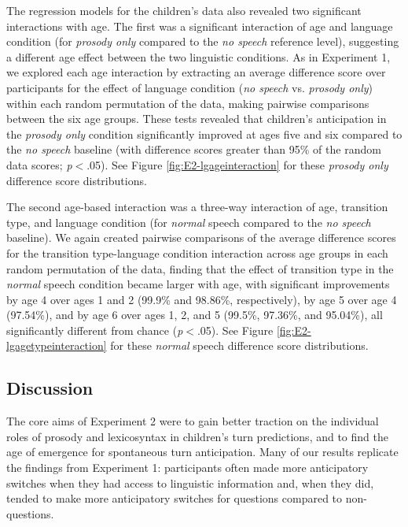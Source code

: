 \documentclass[authoryear, 12pt]{elsarticle}
\begin{document}
The regression models for the children's data also revealed two significant interactions with age. The first was a significant interaction of age and language condition (for \textit{prosody only} compared to the \textit{no speech} reference level), suggesting a different age effect between the two linguistic conditions. As in Experiment 1, we explored each age interaction by extracting an average difference score over participants for the effect of language condition (\textit{no speech} vs. \textit{prosody only}) within each random permutation of the data, making pairwise comparisons between the six age groups. These tests revealed that children's anticipation in the \textit{prosody only} condition significantly improved at ages five and six compared to the \textit{no speech} baseline (with difference scores greater than 95\% of the random data scores; \textit{p}$<$.05). See Figure \ref{fig:E2-lgageinteraction} for these \textit{prosody only} difference score distributions.

The second age-based interaction was a three-way interaction of age, transition type, and language condition (for \textit{normal} speech compared to the \textit{no speech} baseline). We again created pairwise comparisons of the average difference scores for the transition type-language condition interaction across age groups in each random permutation of the data, finding that the effect of transition type in the \textit{normal} speech condition became larger with age, with significant improvements by age 4 over ages 1 and 2 (99.9\% and 98.86\%, respectively), by age 5 over age 4 (97.54\%), and by age 6 over ages 1, 2, and 5 (99.5\%, 97.36\%, and 95.04\%), all significantly different from chance (\textit{p}$<$.05). See Figure \ref{fig:E2-lgagetypeinteraction} for these \textit{normal} speech difference score distributions.

\subsection*{Discussion}
\label{sec:discussion2}

The core aims of Experiment 2 were to gain better traction on the individual roles of prosody and lexicosyntax in children's turn predictions, and to find the age of emergence for spontaneous turn anticipation. Many of our results replicate the findings from Experiment 1: participants often made more anticipatory switches when they had access to linguistic information and, when they did, tended to make more anticipatory switches for questions compared to non-questions. 
\end{document}
